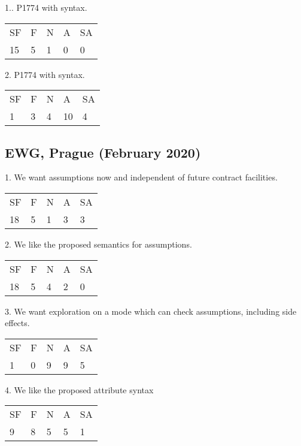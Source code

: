1.. P1774 with  syntax.

\hspace{6mm}
\begin{tabular}{lllll}
SF & F & N & A & SA \\
15 & 5 & 1 & 0 & 0
\end{tabular}

2. P1774 with  syntax.

\hspace{6mm}
\begin{tabular}{lllll}
SF & F & N & A & SA \\
1 & 3 & 4 & 10 & 4
\end{tabular}

\subsection{EWG, Prague (February 2020)}

1. We want assumptions now and independent of future contract facilities.

\hspace{6mm}
\begin{tabular}{lllll}
SF & F & N & A & SA \\
18 & 5 & 1 & 3 & 3
\end{tabular}

2. We like the proposed semantics for assumptions.

\hspace{6mm}
\begin{tabular}{lllll}
SF & F & N & A & SA \\
18 & 5 & 4 & 2 & 0
\end{tabular}

3. We want exploration on a mode which can check assumptions, including side effects.

\hspace{6mm}
\begin{tabular}{lllll}
SF & F & N & A & SA \\
1 & 0 & 9 & 9 & 5
\end{tabular}

4. We like the proposed attribute syntax 

\hspace{6mm}
\begin{tabular}{lllll}
SF & F & N & A & SA \\
9 & 8 & 5 & 5 & 1
\end{tabular}

